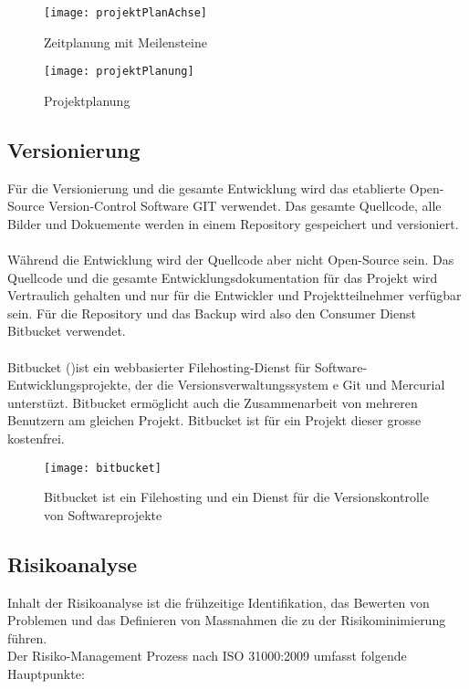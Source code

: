 \begin{figure}[htb!]
	\begin{center}
		\texttt{[image: projektPlanAchse]}
		\caption[Projektplanung Meilensteine]{Zeitplanung mit Meilensteine}
		\label{fig:projektPlanungAchse}
	\end{center}
\end{figure}


\begin{figure}[htb!]
	\begin{center}
		\texttt{[image: projektPlanung]}
		\caption[Projektplanung]{Projektplanung}
		\label{fig:projektPlanung}
	\end{center}
\end{figure}

\subsection{Versionierung}
Für die Versionierung und die gesamte Entwicklung wird das etablierte Open-Source Version-Control Software GIT verwendet. Das gesamte Quellcode, alle Bilder und Dokuemente werden in einem Repository gespeichert und versioniert.
\\
\\
Während die Entwicklung wird der Quellcode aber nicht Open-Source sein. Das Quellcode und die gesamte Entwicklungsdokumentation für das Projekt wird Vertraulich gehalten und nur für die Entwickler und Projektteilnehmer verfügbar sein. Für die Repository und das Backup wird also den Consumer Dienst Bitbucket verwendet.
\\
\\
Bitbucket ()ist ein webbasierter Filehosting-Dienst für Software-Entwicklungsprojekte, der die Versionsverwaltungssystem e Git und Mercurial unterstüzt. Bitbucket ermöglicht auch die Zusammenarbeit von mehreren Benutzern am gleichen Projekt. Bitbucket ist für ein Projekt dieser grosse kostenfrei.
\begin{figure}[htb!]
	\begin{center}
		\texttt{[image: bitbucket]}
		\caption[Bitbucket ist ein Filehosting und ein Dienst für die Versionskontrolle von Softwareprojekte]{Bitbucket ist ein Filehosting und ein Dienst für die Versionskontrolle von Softwareprojekte}
		\label{fig:bitbucket}
	\end{center}
\end{figure}

\subsection{Risikoanalyse}
Inhalt der Risikoanalyse ist die frühzeitige Identifikation, das Bewerten von Problemen und das Definieren von Massnahmen die zu der Risikominimierung führen.
\\
Der Risiko-Management Prozess nach ISO 31000:2009 umfasst folgende Hauptpunkte: 

